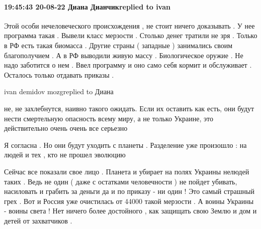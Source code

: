  
 
 
 
 

\paragraph{19:45:43 20-08-22 Диана Дианчикreplied to ivan}

Этой особи нечеловеческого происхождения , не стоит ничего  доказывать . У нее
программа такая . Вывели класс мерзости . Столько денег тратили не зря . Только
в РФ есть такая биомасса . Другие страны ( западные ) занимались своим
благополучием . А в РФ выводили живую массу . Биологическое оружие . Не надо
заботится о нем . Ввел программу и оно само  себя кормит и обслуживает .
Осталось только отдавать приказы .

ivan demidov mozgreplied to Диана

не, не захлебнутся, наивно такого ожидать. Если их оставить как есть, они будут
нести смертельную опасность всему миру, а не только Украине, это действительно
очень очень все серьезно



Я согласна . Но они будут уходить с планеты . Разделение уже произошло : на
людей и тех , кто не прошел эволюцию

Сейчас все показали свое лицо . Планета и убирает на полях Украины нелюдей
таких . Ведь не один ( даже с остатками человечности ) не пойдет убивать,
насиловать и грабить за деньги да и по приказу - ни один ! Это самый страшный
грех . Вот и Россия уже очистилась от 44000 такой мерзости . А воины Украины -
воины света ! Нет ничего более достойного , как защищать свою Землю и дом и
детей от захватчиков .
